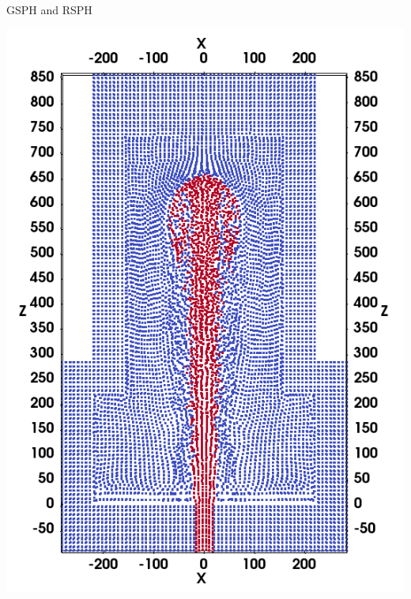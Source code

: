\documentclass{beamer}
\begin{document}
\begin{frame}{GSPH and RSPH}
\begin{minipage}[b][][b]{.25 \textwidth}
        \includegraphics[width=0.99 \textwidth]{./Chapter-4/Figures/RSPH-t3-cutView}
    \end{minipage}%
    
\end{frame}
\end{document}
